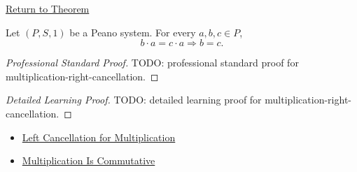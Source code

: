 \newpage
{}
\label{prf:multiplication-right-cancellation}

\begin{remark*}[Return]
\hyperref[thm:multiplication-right-cancellation]{Return to Theorem}
\end{remark*}

\begin{theorem*}
Let $(P,S,1)$ be a Peano system. For every $a,b,c \in P$,
\[
b\cdot a=c\cdot a
\Longrightarrow
b=c.
\]
\end{theorem*}

\begin{proof}[Professional Standard Proof]
\LRAProofBodyStart
TODO: professional standard proof for multiplication-right-cancellation.
\end{proof}

\begin{proof}[Detailed Learning Proof]
\LRAProofBodyStart
TODO: detailed learning proof for multiplication-right-cancellation.
\end{proof}

\begin{remark*}
\end{remark*}

\begin{dependencies}
\begin{itemize}
  \item \hyperref[thm:multiplication-left-cancellation]{Left Cancellation for Multiplication}
  \item \hyperref[thm:multiplication-commutative]{Multiplication Is Commutative}
\end{itemize}
\end{dependencies}

\clearpage
